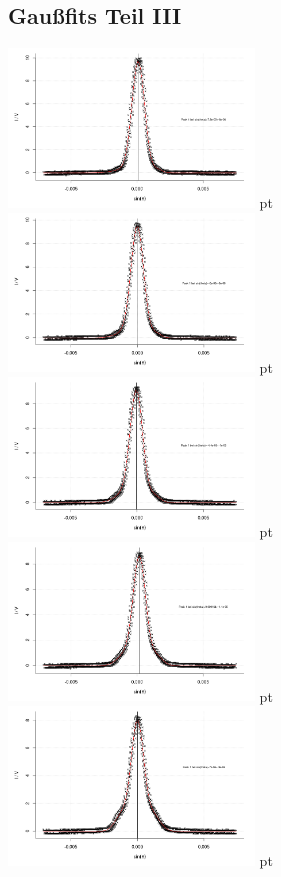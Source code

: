 \documentclass[12pt]{article}
\begin{document}
\subsection{Gaußfits Teil III}
\label{fitergebnisse}
\begin{minipage}[h!]{\textwidth}
	\centering
	\includegraphics[width=0.49\textwidth]{figures/ultraschall1.png} pt
	\includegraphics[width=0.49\textwidth]{figures/ultraschall2.png} pt
	\includegraphics[width=0.49\textwidth]{figures/ultraschall3.png} pt
	\includegraphics[width=0.49\textwidth]{figures/ultraschall4.png} pt
	\includegraphics[width=0.49\textwidth]{figures/ultraschall5.png} pt

\end{minipage}
\end{document}
